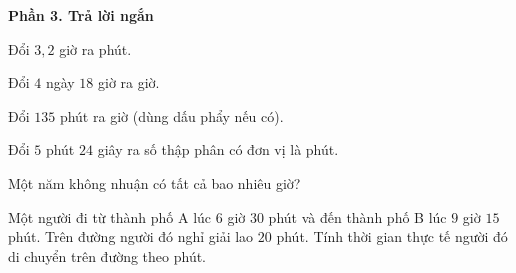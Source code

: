 \textbf{Phần 3. Trả lời ngắn}

\begin{ex} %
Đổi $3{,}2$ giờ ra phút.
\end{ex}

\begin{ex} %
Đổi $4$ ngày $18$ giờ ra giờ.
\end{ex}

\begin{ex} %
Đổi $135$ phút ra giờ (dùng dấu phẩy nếu có).
\end{ex}

\begin{ex} %
Đổi $5$ phút $24$ giây ra số thập phân có đơn vị là phút.
\end{ex}

\begin{ex} %
Một năm không nhuận có tất cả bao nhiêu giờ?
\end{ex}

\begin{ex} %
Một người đi từ thành phố A lúc $6$ giờ $30$ phút và đến thành phố B lúc $9$ giờ $15$ phút. Trên đường người đó nghỉ giải lao $20$ phút. Tính thời gian thực tế người đó di chuyển trên đường theo phút.
\end{ex}
